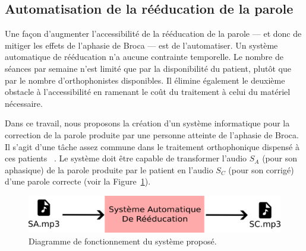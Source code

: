 \subsection{Automatisation de la rééducation de la parole}

Une façon d'augmenter l'accessibilité de la rééducation de la parole 
--- et donc de mitiger les effets de l'aphasie de Broca ---
est de l'automatiser.
Un système automatique de rééducation n'a aucune contrainte temporelle.
Le nombre de séances par semaine n'est limité que par la disponibilité du patient,
plutôt que par le nombre d'orthophonistes disponibles.
Il élimine également le deuxième obstacle à l'accessibilité
en ramenant le coût du traitement à celui du matériel nécessaire.

Dans ce travail, nous proposons la création d'un système informatique 
pour la correction de la parole produite par une personne atteinte de l'aphasie de Broca.
Il s'agit d'une tâche assez commune dans le traitement orthophonique dispensé à ces patients%
~\cite{recover,Acharya_Wroten_2022}.
Le système doit être capable de transformer l'audio \(S_A\) (pour son aphasique) de la parole produite par le patient
en l'audio \(S_C\) (pour son corrigé) d'une parole correcte (voir la Figure~\ref{fig.global-system}).

\begin{figure}[hbt]
    \centering
    \includegraphics[width=.8\textwidth]{assets/images/system.png}
    \caption{Diagramme de fonctionnement du système proposé.}
    \label{fig.global-system}
\end{figure}
